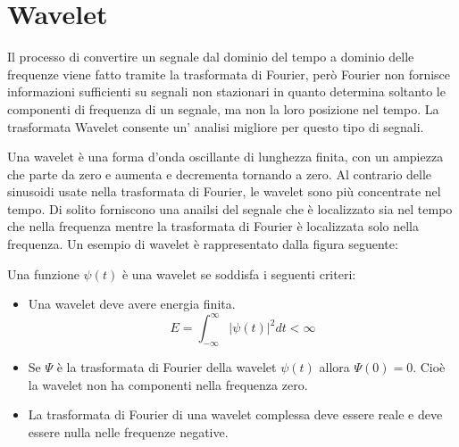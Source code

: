 \section{Wavelet}

 \begin{comment}
Il processo di convertire un segnale dal dominio del tempo a dom delle frequenze viene fatto tramite la trasformatadi Fourier (FT). Però Fourier non fornisce informazioni sufficienti su segnali non stazionari. FT determina soltanto le componenti di frequenza di un segnale, ma non la loro posizione nel tempo. Per risolvere questo inconveniente di usa STFT che usa una tecnica di “finestraggio”.
STFT associa il segnale in uno spazio bidimensionale di tempo e di frequenza utilizzando una singola finestra fissa.
Trasformata wavelet consente l'analisi con durate finestre multiple che consentono una prospettiva grossolana a multirisoluzione fine del segnale.
Essere in grado di dilatare o comprimere la regione variabile della finestra di dimensioni (wavelet), diverse caratteristiche del segnale saranno estratte in WT.
\end{comment}
Il processo di convertire un segnale dal dominio del tempo a dominio delle frequenze viene fatto tramite la trasformata di Fourier, per\`o Fourier non fornisce informazioni sufficienti su segnali non stazionari in quanto determina soltanto le componenti di frequenza di un segnale, ma non la loro posizione nel tempo.
La trasformata Wavelet consente un' analisi migliore per questo tipo di segnali. 

Una wavelet \`e una forma d'onda oscillante di lunghezza finita, con un ampiezza che parte da zero e aumenta e decrementa tornando a zero.
Al contrario delle sinusoidi usate nella trasformata di Fourier, le wavelet sono pi\`u concentrate nel tempo. 
Di solito forniscono una anailsi del segnale che \`e localizzato sia nel tempo che nella frequenza mentre la trasformata di Fourier \`e localizzata solo nella frequenza. 
Un esempio di wavelet \`e rappresentato dalla figura seguente:
\begin{comment}
\begin{figure}[h]
 \centering
 \texttt{[image: ./Meyerwavelet.png]}
 \label{fig: Meyer wavelet}
\end{figure}
\end{comment}


Una funzione $\psi(t)$ \`e una wavelet se soddisfa i seguenti criteri:
\begin{itemize}
  \item 
    Una wavelet deve avere energia finita.
    \[
      E=\displaystyle \int_{-\infty}^{\infty} |\psi(t)|^{2} dt < \infty
    \]
  \item
    Se $\Psi$ \`e la trasformata di Fourier della wavelet $\psi(t)$ allora $\Psi(0)=0$. Cio\`e la wavelet non ha componenti nella frequenza zero.
  \item
    La trasformata di Fourier di una wavelet complessa deve essere reale e deve essere nulla nelle frequenze negative.
\end{itemize}

